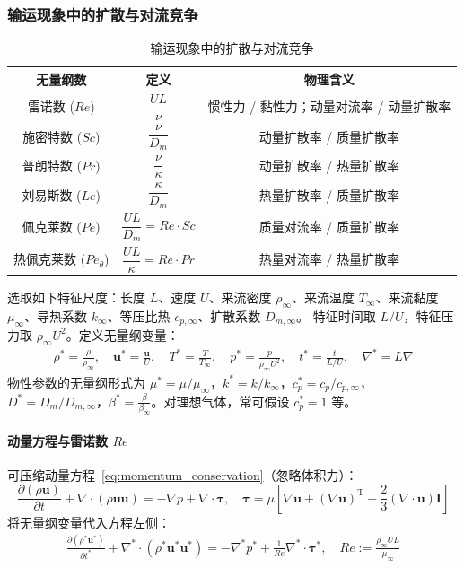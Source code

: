 \subsubsection{输运现象中的扩散与对流竞争}
\begin{table}[h]
\centering
\caption{输运现象中的扩散与对流竞争}
\renewcommand{\arraystretch}{1.5}
\begin{tabular}{|c|c|c|}
\hline
\textbf{无量纲数} & \textbf{定义} & \textbf{物理含义} \\
\hline
雷诺数 ($Re$) & $\dfrac{UL}{\nu}$ & 惯性力 / 黏性力；动量对流率 / 动量扩散率 \\
\hline
施密特数 ($Sc$) & $\dfrac{\nu}{D_m}$ & 动量扩散率 / 质量扩散率 \\
\hline
普朗特数 ($Pr$) & $\dfrac{\nu}{\kappa}$ & 动量扩散率 / 热量扩散率 \\
\hline
刘易斯数 ($Le$) & $\dfrac{\kappa}{D_m}$ & 热量扩散率 / 质量扩散率 \\
\hline
佩克莱数 ($Pe$) & $\dfrac{UL}{D_m} = Re \cdot Sc$ & 质量对流率 / 质量扩散率 \\
\hline
热佩克莱数 ($Pe_\theta$) & $\dfrac{UL}{\kappa} = Re \cdot Pr$ & 热量对流率 / 热量扩散率 \\
\hline
\end{tabular}
\end{table}

选取如下特征尺度：长度 $L$、速度 $U$、来流密度 $\rho_\infty$、来流温度 $T_\infty$、来流黏度 $\mu_\infty$、导热系数 $k_\infty$、等压比热 $c_{p,\infty}$、扩散系数 $D_{m,\infty}$。
特征时间取 $L/U$，特征压力取 $\rho_\infty U^2$。定义无量纲变量：
\begin{align*}
    \rho^* = \frac{\rho}{\rho_\infty}, \quad 
    \mathbf{u}^* = \frac{\mathbf{u}}{U}, \quad 
    T^* = \frac{T}{T_\infty}, \quad 
    p^* = \frac{p}{\rho_\infty U^2}, \quad 
    t^* = \frac{t}{L/U}, \quad 
    \nabla^* = L\nabla 
\end{align*}
物性参数的无量纲形式为 $\mu^* = \mu/\mu_\infty$，$k^* = k/k_\infty$，$c_p^* = c_p/c_{p,\infty}$，$D^* = D_m/D_{m,\infty}$，$\beta^* = \frac{\beta}{\beta_\infty}$。对理想气体，常可假设 $c_p^*=1$ 等。

\paragraph{动量方程与雷诺数 $Re$}
可压缩动量方程~\eqref{eq:momentum_conservation}（忽略体积力）：
\begin{equation}
    \frac{\partial (\rho \mathbf{u})}{\partial t} + \nabla \cdot (\rho \mathbf{u} \mathbf{u}) = -\nabla p + \nabla \cdot \boldsymbol{\tau} ,
    \quad \boldsymbol{\tau} = \mu \left[ \nabla \mathbf{u} + (\nabla \mathbf{u})^\mathrm{T} - \frac{2}{3}(\nabla \cdot \mathbf{u})\mathbf{I} \right]
\end{equation}
将无量纲变量代入方程左侧：
\begin{gather*}
\frac{\partial (\rho^* \mathbf{u}^*)}{\partial t^*} + \nabla^* \cdot (\rho^* \mathbf{u}^* \mathbf{u}^*) = -\nabla^* p^* + \frac{1}{Re} \nabla^* \cdot \boldsymbol{\tau}^* 
,\quad Re := \frac{\rho_\infty U L}{\mu_\infty}
\end{gather*}


